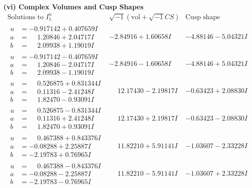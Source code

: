 \documentclass[1p]{elsarticle_modified}
\theoremstyle{definition}
\newcommand{\I}{\sqrt{-1}}
\begin{document}
\newpage\flushleft \textbf{(vi) Complex Volumes and Cusp Shapes}
$$\begin{array}{c|c|c}  
\text{Solutions to }I^u_{1}& \I (\text{vol} + \sqrt{-1}CS) & \text{Cusp shape}\\
 \hline 
\begin{aligned}
u &= -0.917142 + 0.407659 I \\
a &= \phantom{-}1.20846 + 2.04717 I \\
b &= \phantom{-}2.09938 + 1.19019 I\end{aligned}
 & -2.84916 + 1.60658 I & -4.88146 - 5.04321 I \\ \hline\begin{aligned}
u &= -0.917142 - 0.407659 I \\
a &= \phantom{-}1.20846 - 2.04717 I \\
b &= \phantom{-}2.09938 - 1.19019 I\end{aligned}
 & -2.84916 - 1.60658 I & -4.88146 + 5.04321 I \\ \hline\begin{aligned}
u &= \phantom{-}0.526875 + 0.831344 I \\
a &= \phantom{-}0.11316 - 2.41248 I \\
b &= \phantom{-}1.82470 - 0.93091 I\end{aligned}
 & \phantom{-}12.17430 - 2.19817 I & -0.63423 + 2.08830 I \\ \hline\begin{aligned}
u &= \phantom{-}0.526875 - 0.831344 I \\
a &= \phantom{-}0.11316 + 2.41248 I \\
b &= \phantom{-}1.82470 + 0.93091 I\end{aligned}
 & \phantom{-}12.17430 + 2.19817 I & -0.63423 - 2.08830 I \\ \hline\begin{aligned}
u &= \phantom{-}0.467388 + 0.843376 I \\
a &= -0.08288 + 2.25887 I \\
b &= -2.19783 + 0.76965 I\end{aligned}
 & \phantom{-}11.82210 + 5.91141 I & -1.03607 - 2.33228 I \\ \hline\begin{aligned}
u &= \phantom{-}0.467388 - 0.843376 I \\
a &= -0.08288 - 2.25887 I \\
b &= -2.19783 - 0.76965 I\end{aligned}
 & \phantom{-}11.82210 - 5.91141 I & -1.03607 + 2.33228 I \\ \hline\begin{aligned}

\end{aligned}
\end{array}$$
\end{document}
